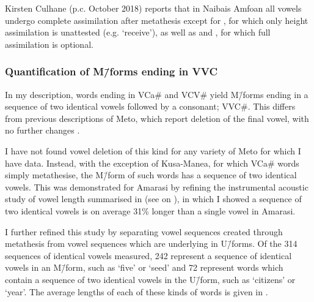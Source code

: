 Kirsten Culhane (p.c. October 2018) reports that in Nai{\Q}bais Amfo{\Q}an
all vowels undergo complete assimilation after metathesis except for ,
for which only height assimilation is unattested
(e.g.  {\ra}  `receive'),
as well as  and , for which full assimilation is optional.

\subsubsection{Quantification of M\=/forms ending in V{\A}V{\A}C}\label{sec:QuaMfoEndVVC}
In my description, words ending in VCa{\#} and V{\sA}CV{\sA}{\#}
yield M\=/forms ending in a sequence of two identical vowels followed
by a consonant; V{\sA}V{\sA}C{\#}.
This differs from previous descriptions of Meto,
which report deletion of the final vowel, with no further changes
\citep{st93,st96,st96b,mccko96,blga98,st08}.

I have not found vowel deletion of this kind
for any variety of Meto for which I have data.
Instead, with the exception of Kusa-Manea, for which
VCa{\#} words simply metathesise,
the M\=/form of such words has a sequence of two identical vowels.
This was demonstrated for Amarasi
by refining the instrumental acoustic study of vowel length
summarised in 
(see  on ),
in which I showed a sequence of two identical vowels
is on average 31{\%} longer than a single vowel in Amarasi.

I further refined this study by separating
vowel sequences created through metathesis
from vowel sequences which are underlying in U\=/forms.
Of the 314 sequences of identical vowels measured,
242 represent a sequence of identical vowels in an M\=/form,
such as  {\ra}  `five' or  {\ra}  `seed'
and 72 represent words which contain a sequence of two identical vowels in the U\=/form,
such as  `citizens' or  `year'.
The average lengths of each of these kinds of words is given in .

